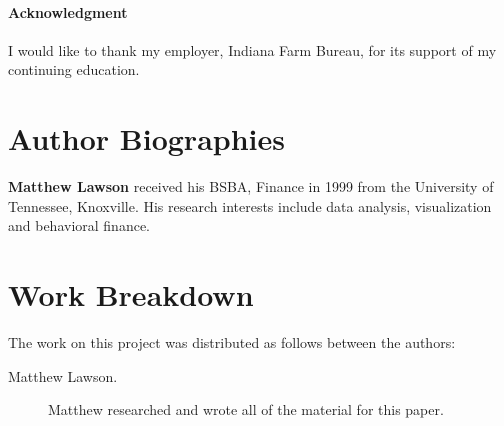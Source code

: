 \documentclass[9pt,twocolumn,twoside]{../../styles/osajnl}
\begin{document}
\paragraph{Acknowledgment}

I would like to thank my employer, Indiana Farm Bureau, for its support of my continuing education.




 
\section*{Author Biographies}
\begingroup
\setlength\intextsep{0pt}
\begin{minipage}[t][3.2cm][t]{1.0\columnwidth} %
  \noindent
  {\bfseries Matthew Lawson} received his BSBA, Finance in 1999 from
  the University of Tennessee, Knoxville. His research interests include
  data analysis, visualization and behavioral finance.
\end{minipage}
\endgroup

\appendix

\section{Work Breakdown}

The work on this project was distributed as follows between the
authors:

\begin{description}

\item[Matthew Lawson.] Matthew researched and wrote all of the material for this paper.

\end{description}
\end{document}
